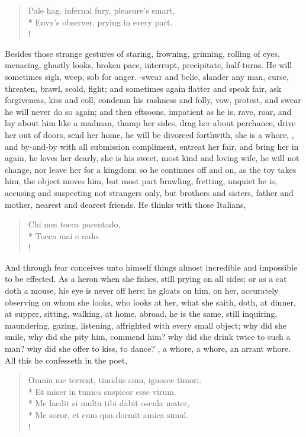 \begin{verse}
Pale hag, infernal fury, pleasure's smart,\\*
Envy's observer, prying in every part.\\!
\end{verse}

Besides those strange gestures of staring, frowning, grinning, rolling
of eyes, menacing, ghastly looks, broken pace, interrupt, precipitate,
half-turns. He will sometimes sigh, weep, sob for anger. -swear and belie, slander any
man, curse, threaten, brawl, scold, fight; and sometimes again flatter
and speak fair, ask forgiveness, kiss and coll, condemn his rashness
and folly, vow, protest, and swear he will never do so again; and then
eftsoons, impatient as he is, rave, roar, and lay about him like a
madman, thump her sides, drag her about perchance, drive her out of
doors, send her home, he will be divorced forthwith, she is a whore,
\etc{}, and by-and-by with all submission compliment, entreat her fair,
and bring her in again, he loves her dearly, she is his sweet, most
kind and loving wife, he will not change, nor leave her for a kingdom;
so he continues off and on, as the toy takes him, the object moves him,
but most part brawling, fretting, unquiet he is, accusing and
suspecting not strangers only, but brothers and sisters, father and
mother, nearest and dearest friends. He thinks with those Italians,
%
\begin{latin}%
\begin{verse}%
Chi non tocca parentado,\\*
Tocca mai e rado.\\!
\end{verse}%
\end{latin}%
%
And through fear conceives unto himself things almost incredible and
impossible to be effected. As a heron when she fishes, still prying on
all sides; or as a cat doth a mouse, his eye is never off hers; he
gloats on him, on her, accurately observing on whom she looks, who
looks at her, what she saith, doth, at dinner, at supper, sitting,
walking, at home, abroad, he is the same, still inquiring, maundering,
gazing, listening, affrighted with every small object; why did she
smile, why did she pity him, commend him? why did she drink twice to
such a man? why did she offer to kiss, to dance? \etc{}, a whore, a whore,
an arrant whore. All this he confesseth in the poet, %
%
\begin{latin}%
\begin{verse}%
Omnia me terrent, timidus sum, ignosce timori.\\*
Et miser in tunica suspicor esse virum.\\*
Me laedit si multa tibi dabit oscula mater,\\*
Me soror, et cum qua dormit amica simul.\\!
\end{verse}%
\end{latin}%
